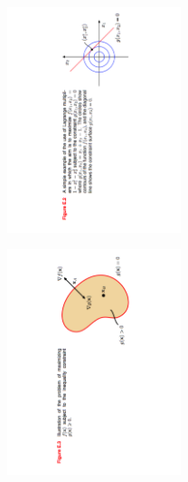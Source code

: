 \documentclass[12pt,letterpaper]{article}
\begin{document}
\begin{itemize}
\begin{center}\includegraphics[width=2in, trim=5cm .5cm 4cm 2cm, clip=true, angle=270]{fig2.pdf}\end{center}

\begin{center}\includegraphics[width=2in, trim=5cm .5cm 4cm 1cm, clip=true, angle=270]{fig3.pdf}\end{center}



\end{itemize}
\end{document}
